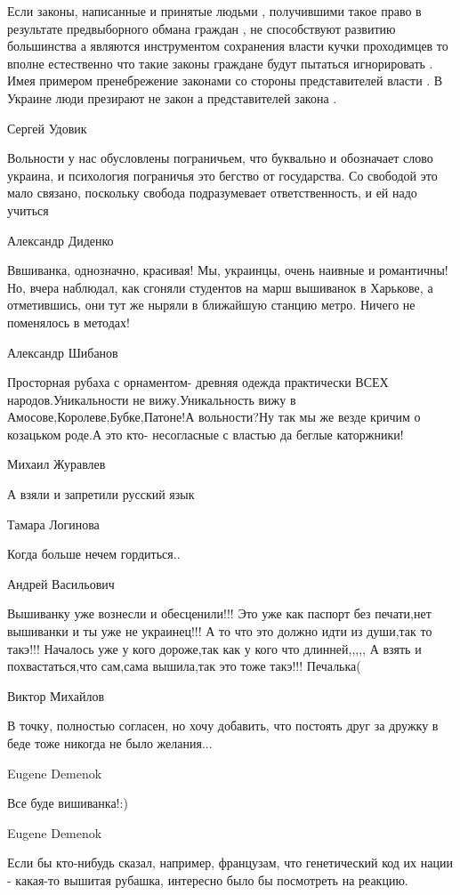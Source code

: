Если законы, написанные и принятые людьми , получившими такое право в
результате предвыборного обмана граждан , не способствуют развитию большинства
а являются инструментом сохранения власти кучки проходимцев то вполне
естественно что такие законы граждане будут пытаться игнорировать . Имея
примером пренебрежение законами со стороны представителей власти . В Украине
люди презирают не закон а представителей закона .

Сергей Удовик

Вольности у нас обусловлены пограничьем, что буквально и обозначает слово
украина, и психология пограничья это бегство от государства. Со свободой это
мало связано, поскольку свобода подразумевает ответственность, и ей надо
учиться

Александр Диденко

Ввшиванка, однозначно, красивая! Мы, украинцы, очень наивные и романтичны! Но,
вчера наблюдал, как сгоняли студентов на марш вышиванок в Харькове, а
отметившись, они тут же ныряли в ближайшую станцию метро. Ничего не поменялось
в методах!

Александр Шибанов

Просторная рубаха с орнаментом- древняя одежда практически ВСЕХ
народов.Уникальности не вижу.Уникальность вижу в
Амосове,Королеве,Бубке,Патоне!А вольности?Ну так мы же везде кричим о козацьком
роде.А это кто- несогласные с властью да беглые каторжники!

Михаил Журавлев

А взяли и запретили русский язык

Тамара Логинова

Когда больше нечем гордиться..

Андрей Васильович

Вышиванку уже вознесли и обесценили!!! Это уже как паспорт без печати,нет
вышиванки и ты уже не украинец!!! А то что это должно идти из души,так то
такэ!!! Началось уже у кого дороже,так как у кого что длинней,,,,, А взять и
похвастаться,что сам,сама вышила,так это тоже такэ!!! Печалька(

Виктор Михайлов

В точку, полностью согласен, но хочу добавить, что постоять друг за дружку в
беде тоже никогда не было желания...

Eugene Demenok

Все буде вишиванка!:)

Eugene Demenok

Если бы кто-нибудь сказал, например, французам, что генетический код их нации -
какая-то вышитая рубашка, интересно было бы посмотреть на реакцию.

